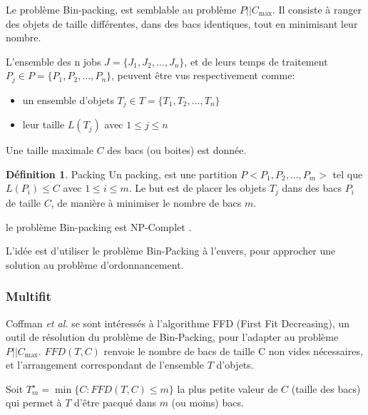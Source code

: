 \documentclass[a4paper,12pt]{report}
\theoremstyle{plain}				%
\theoremstyle{definition}				%
\newtheorem{definition}{Définition} %
\newcommand\problemGrahamP{$P||C_{\max}$\xspace}
\newcommand{\tdi}[1]{\todo[inline]{{#1}}{}}
\newcommand{\lp}[1]{\todo[author=LP,color=yellow,inline]{#1}}
\begin{document}
Le problème Bin-packing, est semblable au problème \problemGrahamP.
Il consiste à ranger des objets de taille différentes, dans des bacs
identiques, tout en minimisant leur nombre.

L'ensemble des n jobs $J = \{J_1, J_2, \ldots, J_n\}$, et de leurs temps de
traitement $P_j \in P = \{P_1, P_2, ..., P_n\}$, peuvent être vus
respectivement comme:
\begin{itemize}
\item un ensemble d'objets $T_j \in T = \{T_1, T_2, ..., T_n\}$
\item leur taille $L(T_j)$ avec $1 \le j \le n$
\end{itemize}
Une taille maximale $C$ des bacs (ou boites) est donnée.
\bigskip

\begin{definition}{Packing}
  Un packing, est une partition $P<P_1, P_2, ..., P_m>$ tel que
  $L(P_i) \leq C$ avec $1 \leq i\leq m$.
  Le but est de placer les objets $T_j$ dans des bacs $P_i$ de taille
  $C$, de manière à minimiser le nombre de bacs $m$.
\end{definition}

le problème Bin-packing est NP-Complet \cite{Johnson1974WorstCasePB}.

L'idée est d'utiliser le problème Bin-Packing à l'envers, pour
approcher une solution au problème d'ordonnancement.


\subsubsection{Multifit}

Coffman \emph{et al.} \cite{coffman1978application} se sont
intéressés à l'algorithme FFD (First Fit Decreasing), un outil de
résolution du problème de Bin-Packing, pour l'adapter au problème
\problemGrahamP.
$FFD(T,C)$ renvoie le nombre de bacs de taille C non vides
nécessaires, et l'arrangement correspondant de l'ensemble $T$ d'objets.

\bigskip
Soit $T_m^\star = \min\{C:FFD(T,C) \leq m\}$ la plus petite valeur de
$C$ (taille des bacs) qui permet à $T$ d'être pacqué dans $m$ (ou moins)
bacs.

\bigskip
\end{document}
